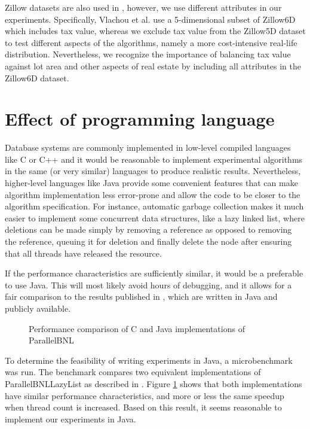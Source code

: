 \documentclass[12pt,a4paper,twoside]{report}
\begin{document}
Zillow datasets are also used in \cite{vlachou2008angle}, however, we
use different attributes in our experiments. Specifically, Vlachou et
al. use a 5-dimensional subset of Zillow6D which includes tax value,
whereas we exclude tax value from the Zillow5D dataset to test
different aspects of the algorithms, namely a more cost-intensive
real-life distribution. Nevertheless, we recognize the importance of
balancing tax value against lot area and other aspects of real estate
by including all attributes in the Zillow6D dataset.

\section{Effect of programming language} 
\label{sec:microbench}

Database systems are commonly implemented in low-level compiled
languages like C or C++ and it would be reasonable to implement
experimental algorithms in the same (or very similar) languages to
produce realistic results. Nevertheless, higher-level languages
like Java provide some convenient features that can make algorithm
implementation less error-prone
and allow the code to be closer to the algorithm specification. For
instance, automatic garbage collection makes it much easier to implement
some concurrent data structures, like a lazy linked list, where deletions
can be made simply by removing a reference as opposed to removing the
reference, queuing it for deletion and finally delete the node after
ensuring that all threads have released the resource.

If the performance characteristics are sufficiently similar, it would be a
preferable to use Java. This will most likely avoid hours of debugging, and
it allows for a fair comparison to the results published in
\cite{selke2010highly}, which are written in Java and publicly available.

\begin{figure}[H]
	\centering
	\caption{Performance comparison of C and Java implementations of ParallelBNL}
	\label{fig:microbenchmark}
\end{figure}

To determine the feasibility of writing experiments in Java, a
microbenchmark was run. The benchmark compares two equivalent
implementations of ParallelBNLLazyList as described in
\cite{selke2010highly}. Figure \ref{fig:microbenchmark} shows that
both implementations have similar performance characteristics, and
more or less the same speedup when thread count is increased. Based on
this result, it seems reasonable to implement our experiments in Java.
\end{document}
